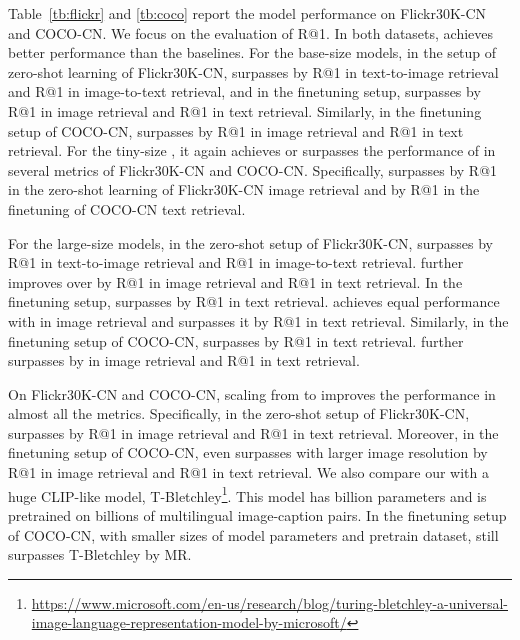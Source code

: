 \documentclass[11pt]{article}
\begin{document}
Table~\ref{tb:flickr} and \ref{tb:coco} report the model performance on Flickr30K-CN and COCO-CN. 
We focus on the evaluation of R@1. 
In both datasets,  achieves better performance than the baselines. 
For the base-size models, in the setup of zero-shot learning of Flickr30K-CN,  surpasses  by  R@1 in text-to-image retrieval and  R@1 in image-to-text retrieval, and in the finetuning setup,  surpasses  by  R@1 in image retrieval and  R@1 in text retrieval. 
Similarly, in the finetuning setup of COCO-CN,  surpasses  by  R@1 in image retrieval and  R@1 in text retrieval. For the tiny-size , it again achieves or surpasses the performance of  in several metrics of Flickr30K-CN and COCO-CN. Specifically,  surpasses  by  R@1 in the zero-shot learning of Flickr30K-CN image retrieval and by  R@1 in the finetuning of COCO-CN text retrieval.

For the large-size models, in the zero-shot setup of Flickr30K-CN,  surpasses  by  R@1 in text-to-image retrieval and  R@1 in image-to-text retrieval.  further improves over  by  R@1 in image retrieval and  R@1 in text retrieval. In the finetuning setup,  surpasses  by  R@1 in text retrieval.  achieves equal performance with  in image retrieval and surpasses it by  R@1 in text retrieval. Similarly, in the finetuning setup of COCO-CN,  surpasses  by  R@1 in text retrieval.  further surpasses  by  in image retrieval and  R@1 in text retrieval. 

On Flickr30K-CN and COCO-CN, scaling from  to  improves the performance in almost all the metrics. Specifically, in the zero-shot setup of Flickr30K-CN,  surpasses  by  R@1 in image retrieval and  R@1 in text retrieval. Moreover, in the finetuning setup of COCO-CN,  even surpasses  with larger image resolution by  R@1 in image retrieval and  R@1 in text retrieval. 
We also compare our  with a huge CLIP-like model, T-Bletchley\footnote{\url{https://www.microsoft.com/en-us/research/blog/turing-bletchley-a-universal-image-language-representation-model-by-microsoft/}}. This model has  billion parameters and is pretrained on billions of multilingual image-caption pairs. In the finetuning setup of COCO-CN, with smaller sizes of model parameters and pretrain dataset,  still surpasses T-Bletchley by  MR.
\end{document}
